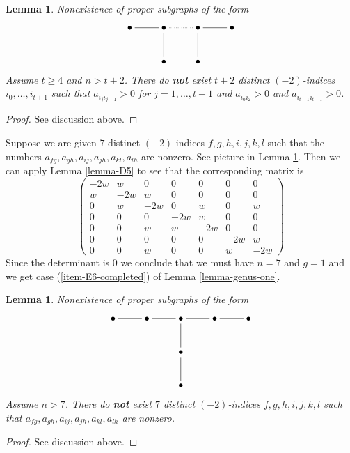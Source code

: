 \documentclass{stacks-project}
\theoremstyle{plain}
\newtheorem{lemma}[subsection]{Lemma}
\theoremstyle{definition}
\theoremstyle{remark}
\numberwithin{equation}{subsection}
\begin{document}
\begin{lemma}
\label{lemma-double-triple}
Nonexistence of proper subgraphs of the form
$$
\xymatrix{
\bullet \ar@{-}[r] & \bullet \ar@{..}[r] \ar@{-}[d] &
\bullet \ar@{-}[d] \ar@{-}[r] & \bullet \\
& \bullet & \bullet
}
$$
Assume $t \geq 4$ and $n > t + 2$.
There do {\bf not} exist $t + 2$ distinct
$(-2)$-indices $i_0, \ldots, i_{t + 1}$ such that
$a_{i_ji_{j + 1}} > 0$ for $j = 1, \ldots, t - 1$
and $a_{i_0i_2} > 0$ and $a_{i_{t - 1}i_{t + 1}} > 0$.
\end{lemma}

\begin{proof}
See discussion above.
\end{proof}

\noindent
Suppose we are given $7$ distinct $(-2)$-indices $f, g, h, i, j, k, l$
such that the numbers
$a_{fg}, a_{gh}, a_{ij}, a_{jh}, a_{kl}, a_{lh}$ are nonzero.
See picture in Lemma \ref{lemma-E6-completed}. Then we can apply
Lemma \ref{lemma-D5} to see that the corresponding matrix is
$$
\left(
\begin{matrix}
-2w & w & 0 & 0 & 0 & 0 & 0 \\
w & -2w & w & 0 & 0 & 0 & 0 \\
0 & w & -2w & 0 & w & 0 & w \\
0 & 0 & 0 & -2w & w & 0 & 0 \\
0 & 0 & w & w & -2w & 0 & 0 \\
0 & 0 & 0 & 0 & 0 & -2w & w \\
0 & 0 & w & 0 & 0 & w & -2w
\end{matrix}
\right)
$$
Since the determinant is $0$ we conclude that we must have $n = 7$
and $g = 1$ and we get case (\ref{item-E6-completed})
of Lemma \ref{lemma-genus-one}.

\begin{lemma}
\label{lemma-E6-completed}
Nonexistence of proper subgraphs of the form
$$
\xymatrix{
\bullet \ar@{-}[r] & \bullet \ar@{-}[r] & \bullet \ar@{-}[r] \ar@{-}[d] &
\bullet \ar@{-}[r] & \bullet \\
& & \bullet \ar@{-}[d] \\
& & \bullet
}
$$
Assume $n > 7$. There do {\bf not} exist $7$ distinct
$(-2)$-indices $f, g, h, i, j, k, l$
such that $a_{fg}, a_{gh}, a_{ij}, a_{jh}, a_{kl}, a_{lh}$ are nonzero.
\end{lemma}

\begin{proof}
See discussion above.
\end{proof}
\end{document}
